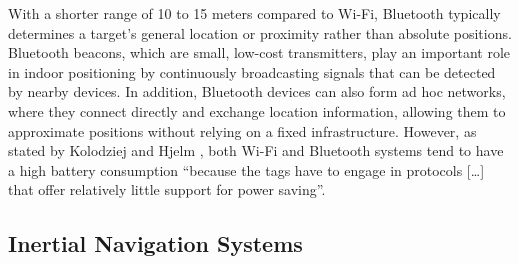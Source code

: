 With a shorter range of 10 to 15 meters compared to \acs{Wi-Fi}, Bluetooth typically determines a target's general location or proximity rather than absolute positions. 
Bluetooth beacons, which are small, low-cost transmitters, play an important role in indoor positioning by continuously broadcasting signals that can be detected by nearby devices.
In addition, Bluetooth devices can also form ad hoc networks, where they connect directly and exchange location information, allowing them to approximate positions without relying on a fixed infrastructure.
However, as stated by Kolodziej and Hjelm \cite{kolodziej2017local}, both \acs{Wi-Fi} and Bluetooth systems tend to have a high battery consumption “because the tags have to engage in protocols […] that offer relatively little support for power saving”.

\subsection{Inertial Navigation Systems}

